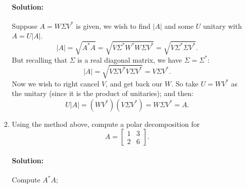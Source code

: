 \documentclass{article}
\begin{document}
\begin{enumerate}
\begin{enumerate}[label= (\alph*)]
    \paragraph{Solution: }Suppose $A=W\Sigma V ^* $ is given, we wish to find $|A|$ and some $U$ unitary with $A = U|A|$. 
    \[
    |A|=\sqrt{A^* A} =\sqrt{V\Sigma^* W^* W\Sigma V^* } =\sqrt{V\Sigma^* \Sigma V^* } 
    .\] 
    But recalling that $\Sigma$ is a real diagonal matrix, we have $\Sigma=\Sigma^* $:
    \[
    |A|=\sqrt{V\Sigma V^* V\Sigma V^* } =V\Sigma V^* 
    .\] 
    Now we wish to right cancel $V$, and get back our $W$. So take $U=WV^* $ as the unitary (since it is the product of unitaries); and then:
     \[
    U|A|=(WV^* )(V\Sigma V^* )=W\Sigma V^* =A
    .\] 

\item Using the method above, compute a polar decomposition for
\[
    A=\begin{bmatrix} 1&3\\2&6 \end{bmatrix} 
.\] 
\paragraph{Solution: }Compute $A^* A$;


\end{enumerate}
\end{enumerate}
\end{document}
